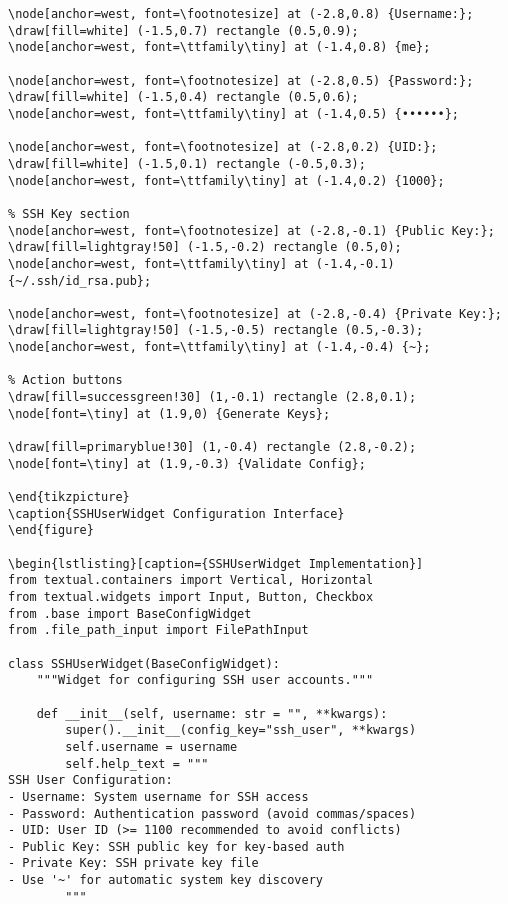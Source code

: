 \documentclass[11pt,a4paper]{article}
\begin{document}
\begin{lstlisting}[caption={ValidatedInput Implementation}]
% User configuration form
\node[anchor=west, font=\footnotesize] at (-2.8,0.8) {Username:};
\draw[fill=white] (-1.5,0.7) rectangle (0.5,0.9);
\node[anchor=west, font=\ttfamily\tiny] at (-1.4,0.8) {me};

\node[anchor=west, font=\footnotesize] at (-2.8,0.5) {Password:};
\draw[fill=white] (-1.5,0.4) rectangle (0.5,0.6);
\node[anchor=west, font=\ttfamily\tiny] at (-1.4,0.5) {••••••};

\node[anchor=west, font=\footnotesize] at (-2.8,0.2) {UID:};
\draw[fill=white] (-1.5,0.1) rectangle (-0.5,0.3);
\node[anchor=west, font=\ttfamily\tiny] at (-1.4,0.2) {1000};

% SSH Key section
\node[anchor=west, font=\footnotesize] at (-2.8,-0.1) {Public Key:};
\draw[fill=lightgray!50] (-1.5,-0.2) rectangle (0.5,0);
\node[anchor=west, font=\ttfamily\tiny] at (-1.4,-0.1) {~/.ssh/id_rsa.pub};

\node[anchor=west, font=\footnotesize] at (-2.8,-0.4) {Private Key:};
\draw[fill=lightgray!50] (-1.5,-0.5) rectangle (0.5,-0.3);
\node[anchor=west, font=\ttfamily\tiny] at (-1.4,-0.4) {~};

% Action buttons
\draw[fill=successgreen!30] (1,-0.1) rectangle (2.8,0.1);
\node[font=\tiny] at (1.9,0) {Generate Keys};

\draw[fill=primaryblue!30] (1,-0.4) rectangle (2.8,-0.2);
\node[font=\tiny] at (1.9,-0.3) {Validate Config};

\end{tikzpicture}
\caption{SSHUserWidget Configuration Interface}
\end{figure}

\begin{lstlisting}[caption={SSHUserWidget Implementation}]
from textual.containers import Vertical, Horizontal
from textual.widgets import Input, Button, Checkbox
from .base import BaseConfigWidget
from .file_path_input import FilePathInput

class SSHUserWidget(BaseConfigWidget):
    """Widget for configuring SSH user accounts."""
    
    def __init__(self, username: str = "", **kwargs):
        super().__init__(config_key="ssh_user", **kwargs)
        self.username = username
        self.help_text = """
SSH User Configuration:
- Username: System username for SSH access
- Password: Authentication password (avoid commas/spaces)
- UID: User ID (>= 1100 recommended to avoid conflicts)
- Public Key: SSH public key for key-based auth
- Private Key: SSH private key file
- Use '~' for automatic system key discovery
        """
        

\end{lstlisting}
\end{document}
